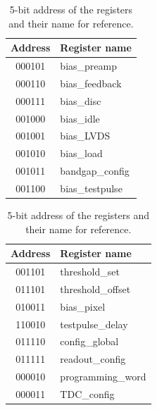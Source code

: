 		\begin{table}[h!]
			\centering
			\begin{minipage}[t]{0.48\textwidth}
			\centering
				\begin{tabular}{|c|l|}
					\hline
					\textbf{Address} & \textbf{Register name} \\ \hline
					000101 & bias\_preamp \\ \hline
					000110 & bias\_feedback \\ \hline
					000111 & bias\_disc \\ \hline
					001000 & bias\_idle \\ \hline
					001001 & bias\_LVDS \\ \hline
					001010 & bias\_load \\ \hline
					001011 & bandgap\_config \\ \hline
					001100 & bias\_testpulse \\ \hline
				\end{tabular}
			\end{minipage}
			\hfill
			\begin{minipage}[t]{0.48\textwidth}
			\centering
				\begin{tabular}{|c|l|}
					\hline
					\textbf{Address} & \textbf{Register name} \\ \hline
					001101 & threshold\_set \\ \hline
					011101 & threshold\_offset \\ \hline
					010011 & bias\_pixel \\ \hline
					110010 & testpulse\_delay \\ \hline
					011110 & config\_global \\ \hline
					011111 & readout\_config \\ \hline
					000010 & programming\_word \\ \hline
					000011 & TDC\_config \\ \hline
				\end{tabular}
			\end{minipage}

			\caption{5-bit address of the registers and their name for reference.}
			\label{tab:SPI_parameters}
		\end{table}
		
